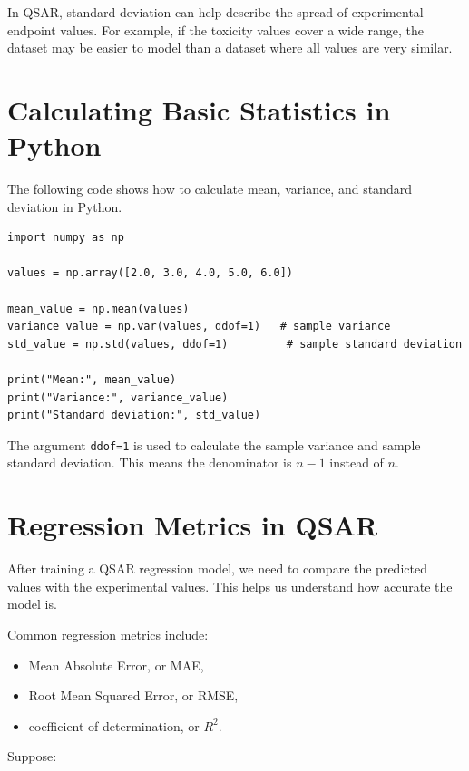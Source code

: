 \documentclass[11pt]{report}
\newenvironment{Important note}{\begin{quote}\color{red}\textbf{Important note:} }{\end{quote}}
\begin{document}
In QSAR, standard deviation can help describe the spread of experimental endpoint values. For example, if the toxicity values cover a wide range, the dataset may be easier to model than a dataset where all values are very similar.

\section{Calculating Basic Statistics in Python}

The following code shows how to calculate mean, variance, and standard deviation in Python.

\begin{lstlisting}[style=pythonstyle, caption={Calculating mean, variance, and standard deviation.}]
import numpy as np

values = np.array([2.0, 3.0, 4.0, 5.0, 6.0])

mean_value = np.mean(values)
variance_value = np.var(values, ddof=1)   # sample variance
std_value = np.std(values, ddof=1)         # sample standard deviation

print("Mean:", mean_value)
print("Variance:", variance_value)
print("Standard deviation:", std_value)
\end{lstlisting}

The argument \texttt{ddof=1} is used to calculate the sample variance and sample standard deviation. This means the denominator is $n-1$ instead of $n$.

\section{Regression Metrics in QSAR}

After training a QSAR regression model, we need to compare the predicted values with the experimental values. This helps us understand how accurate the model is.

Common regression metrics include:

\begin{itemize}[leftmargin=*]
    \item Mean Absolute Error, or MAE,
    \item Root Mean Squared Error, or RMSE,
    \item coefficient of determination, or $R^2$.
\end{itemize}

Suppose:
\end{document}
